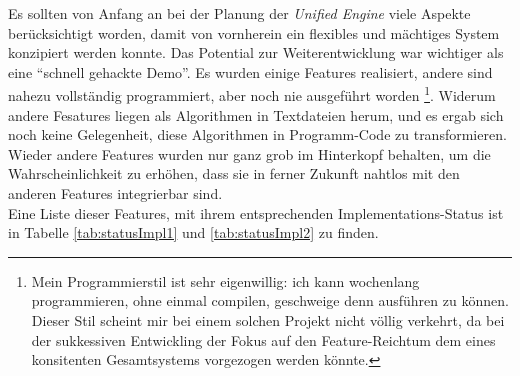 	Es sollten von Anfang an bei der Planung der \emph{Unified Engine} viele Aspekte berücksichtigt worden,
	damit von vornherein ein flexibles und mächtiges System konzipiert werden konnte.
	Das Potential zur Weiterentwicklung war wichtiger als eine "`schnell gehackte Demo"'.
	Es wurden einige Features realisiert, andere sind nahezu vollständig programmiert, aber noch nie ausgeführt worden
	\footnote{Mein Programmierstil ist sehr eigenwillig: ich kann wochenlang programmieren, 
	ohne einmal compilen, geschweige denn ausführen zu können. Dieser Stil scheint mir bei einem solchen Projekt nicht 
	völlig verkehrt, da bei der sukkessiven Entwickling der Fokus auf den Feature-Reichtum dem eines konsitenten 
	Gesamtsystems vorgezogen werden könnte.}. Widerum andere Fesatures liegen als Algorithmen in Textdateien herum, und 
	es ergab sich noch keine Gelegenheit, diese Algorithmen in Programm-Code zu transformieren.
	Wieder andere Features wurden nur ganz grob im Hinterkopf behalten, um die Wahrscheinlichkeit zu erhöhen, 
	dass sie in ferner Zukunft nahtlos mit den anderen Features integrierbar sind.\\
	Eine Liste dieser Features, mit ihrem entsprechenden Implementations-Status ist in 
	Tabelle \ref{tab:statusImpl1} und \ref{tab:statusImpl2} zu finden.\\
										  

